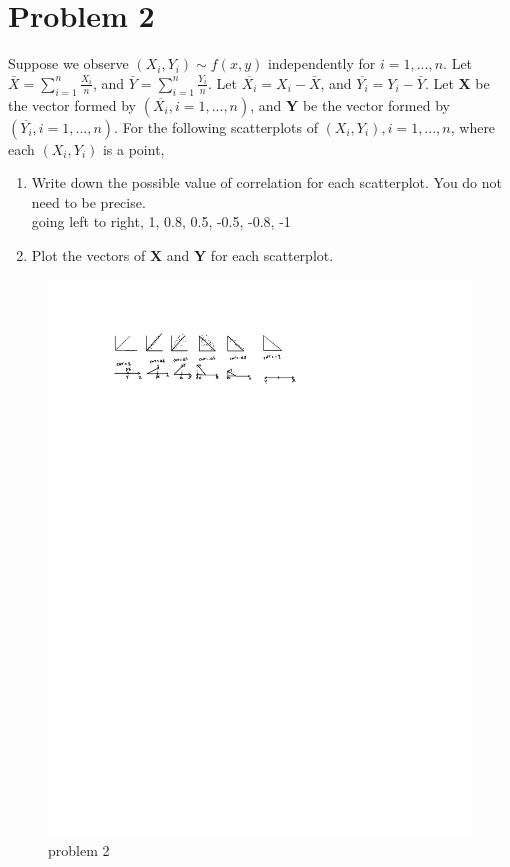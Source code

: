 \documentclass{article}
\begin{document}
    \section{Problem 2}
    Suppose we observe $(X_i, Y_i) \sim f (x, y)$ independently for $i = 1, ..., n.$ Let $\bar{X} =\sum_{i=1}^{n} \frac{X_i}{n}$, and $\bar{Y} = \sum_{i=1}^{n} \frac{Y_i}{n}$. Let $\overline{X_i} = X_i - \bar{X}$, and $\overline{Y_i} = Y_i - \bar{Y}$. Let \textbf{X} be the vector formed by $( \overline{X_i}, i = 1, ..., n)$, and \textbf{Y} be the vector formed by $( \overline{Y_i}, i = 1, ..., n)$. For the following scatterplots of $(X_i, Y_i), i = 1, ..., n$, where each $(X_i, Y_i)$ is a point,
    \begin{enumerate}
        \item Write down the possible value of correlation for each scatterplot. You do not need to be precise.\\
            going left to right, 1, 0.8, 0.5, -0.5, -0.8, -1
        \item  Plot the vectors of \textbf{X} and \textbf{Y} for each scatterplot.

    \end{enumerate}
    \begin{figure}[H]
        \centering
        \includegraphics[width=\textwidth]{Problem_2.pdf}
        \caption{problem 2}
        \label{fig:my_image}
    \end{figure}
\end{document}
